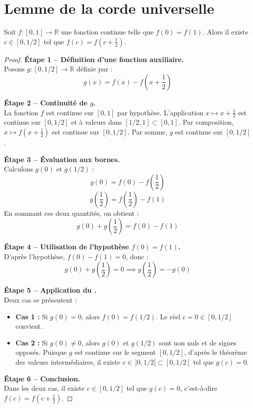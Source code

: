 \documentclass[11pt,a4paper]{article}
\begin{document}
\section{Lemme de la corde universelle}

\begin{theorem}
Soit $f : [0,1] \to \mathbb{R}$ une fonction continue telle que $f(0) = f(1)$. 
Alors il existe $c \in [0, 1/2]$ tel que $f(c) = f\left(c + \frac{1}{2}\right)$.
\end{theorem}

\begin{proof}
\noindent
\textbf{Étape 1 -- Définition d'une fonction auxiliaire.}\\
Posons $g : [0, 1/2] \to \mathbb{R}$ définie par :
\[ g(x) = f(x) - f\left(x + \frac{1}{2}\right) \]

\textbf{Étape 2 -- Continuité de $g$.}\\
La fonction $f$ est continue sur $[0,1]$ par hypothèse. L'application $x \mapsto x + \frac{1}{2}$ est continue sur $[0, 1/2]$ et à valeurs dans $[1/2, 1] \subset [0,1]$. Par composition, $x \mapsto f\left(x + \frac{1}{2}\right)$ est continue sur $[0, 1/2]$. Par somme, $g$ est continue sur $[0, 1/2]$.

\textbf{Étape 3 -- Évaluation aux bornes.}\\
Calculons $g(0)$ et $g(1/2)$ :
\[ g(0) = f(0) - f\left(\frac{1}{2}\right) \]
\[ g\left(\frac{1}{2}\right) = f\left(\frac{1}{2}\right) - f(1) \]
En sommant ces deux quantités, on obtient :
\[ g(0) + g\left(\frac{1}{2}\right) = f(0) - f(1) \]

\textbf{Étape 4 -- Utilisation de l'hypothèse $f(0) = f(1)$.}\\
D'après l'hypothèse, $f(0) - f(1) = 0$, donc :
\[ g(0) + g\left(\frac{1}{2}\right) = 0 \implies g\left(\frac{1}{2}\right) = -g(0) \]

\textbf{Étape 5 -- Application du .}\\
Deux cas se présentent :
\begin{itemize}
    \item \textbf{Cas 1 :} Si $g(0) = 0$, alors $f(0) = f(1/2)$. Le réel $c = 0 \in [0, 1/2]$ convient.
    \item \textbf{Cas 2 :} Si $g(0) \neq 0$, alors $g(0)$ et $g(1/2)$ sont non nuls et de signes opposés. Puisque $g$ est continue sur le segment $[0, 1/2]$, d'après le théorème des valeurs intermédiaires, il existe $c \in \, ]0, 1/2[ \subset [0, 1/2]$ tel que $g(c) = 0$.
\end{itemize}

\textbf{Étape 6 -- Conclusion.}\\
Dans les deux cas, il existe $c \in [0, 1/2]$ tel que $g(c) = 0$, c'est-à-dire $f(c) = f\left(c + \frac{1}{2}\right)$.
\end{proof}
\end{document}

